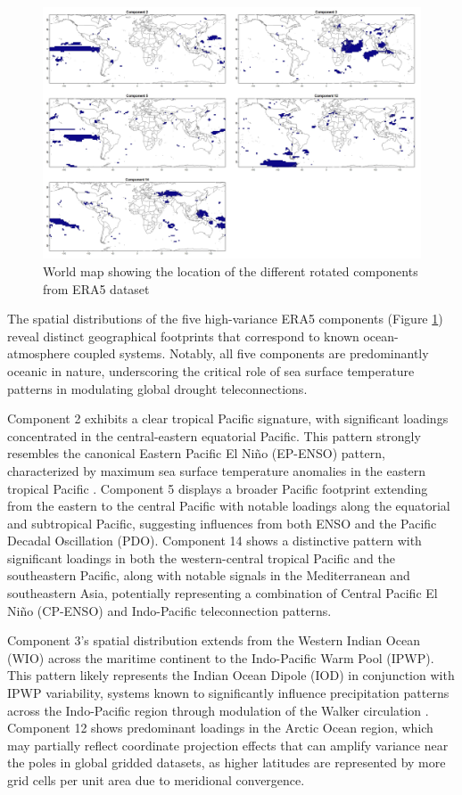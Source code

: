 \documentclass[
]{krantz}
\begin{document}
\begin{figure}

{\centering \includegraphics[width=0.75\linewidth]{work/02-causaldisc/figures/ERA5/component_maps} 

}

\caption{World map showing the location of the different rotated components from ERA5 dataset }\label{fig:figure3}
\end{figure}

The spatial distributions of the five high-variance ERA5 components (Figure \ref{fig:figure3}) reveal distinct geographical footprints that correspond to known ocean-atmosphere coupled systems. Notably, all five components are predominantly oceanic in nature, underscoring the critical role of sea surface temperature patterns in modulating global drought teleconnections.

Component 2 exhibits a clear tropical Pacific signature, with significant loadings concentrated in the central-eastern equatorial Pacific. This pattern strongly resembles the canonical Eastern Pacific El Niño (EP-ENSO) pattern, characterized by maximum sea surface temperature anomalies in the eastern tropical Pacific \citep{dilorenzo2013}. Component 5 displays a broader Pacific footprint extending from the eastern to the central Pacific with notable loadings along the equatorial and subtropical Pacific, suggesting influences from both ENSO and the Pacific Decadal Oscillation (PDO). Component 14 shows a distinctive pattern with significant loadings in both the western-central tropical Pacific and the southeastern Pacific, along with notable signals in the Mediterranean and southeastern Asia, potentially representing a combination of Central Pacific El Niño (CP-ENSO) and Indo-Pacific teleconnection patterns.

Component 3's spatial distribution extends from the Western Indian Ocean (WIO) across the maritime continent to the Indo-Pacific Warm Pool (IPWP). This pattern likely represents the Indian Ocean Dipole (IOD) in conjunction with IPWP variability, systems known to significantly influence precipitation patterns across the Indo-Pacific region through modulation of the Walker circulation \citep{zhang2020, newton2006}. Component 12 shows predominant loadings in the Arctic Ocean region, which may partially reflect coordinate projection effects that can amplify variance near the poles in global gridded datasets, as higher latitudes are represented by more grid cells per unit area due to meridional convergence.
\end{document}
